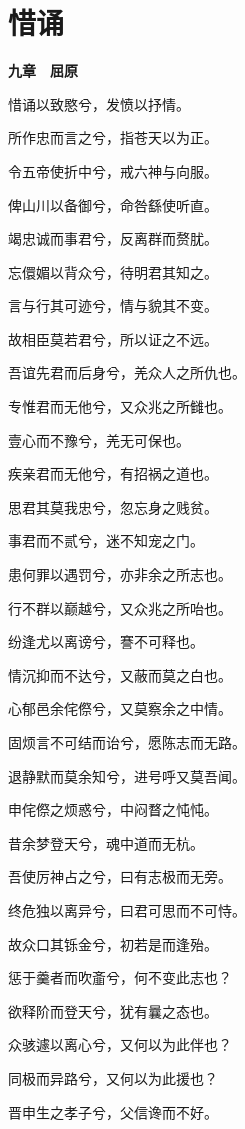 \documentclass[12pt,a4paper]{ctexbook}
\begin{document}
\section{惜诵}
\textbf{九章　屈原}\par\vspace{0.5em}
惜诵以致愍兮，发愤以抒情。\par
所作忠而言之兮，指苍天以为正。\par
令五帝使折中兮，戒六神与向服。\par
俾山川以备御兮，命咎繇使听直。\par
竭忠诚而事君兮，反离群而赘肬。\par
忘儇媚以背众兮，待明君其知之。\par
言与行其可迹兮，情与貌其不变。\par
故相臣莫若君兮，所以证之不远。\par
吾谊先君而后身兮，羌众人之所仇也。\par
专惟君而无他兮，又众兆之所雠也。\par
壹心而不豫兮，羌无可保也。\par
疾亲君而无他兮，有招祸之道也。\par
思君其莫我忠兮，忽忘身之贱贫。\par
事君而不贰兮，迷不知宠之门。\par
患何罪以遇罚兮，亦非余之所志也。\par
行不群以巅越兮，又众兆之所咍也。\par
纷逢尤以离谤兮，謇不可释也。\par
情沉抑而不达兮，又蔽而莫之白也。\par
心郁邑余侘傺兮，又莫察余之中情。\par
固烦言不可结而诒兮，愿陈志而无路。\par
退静默而莫余知兮，进号呼又莫吾闻。\par
申侘傺之烦惑兮，中闷瞀之忳忳。\par
昔余梦登天兮，魂中道而无杭。\par
吾使厉神占之兮，曰有志极而无旁。\par
终危独以离异兮，曰君可思而不可恃。\par
故众口其铄金兮，初若是而逢殆。\par
惩于羹者而吹齑兮，何不变此志也？\par
欲释阶而登天兮，犹有曩之态也。\par
众骇遽以离心兮，又何以为此伴也？\par
同极而异路兮，又何以为此援也？\par
晋申生之孝子兮，父信谗而不好。\par
\end{document}
